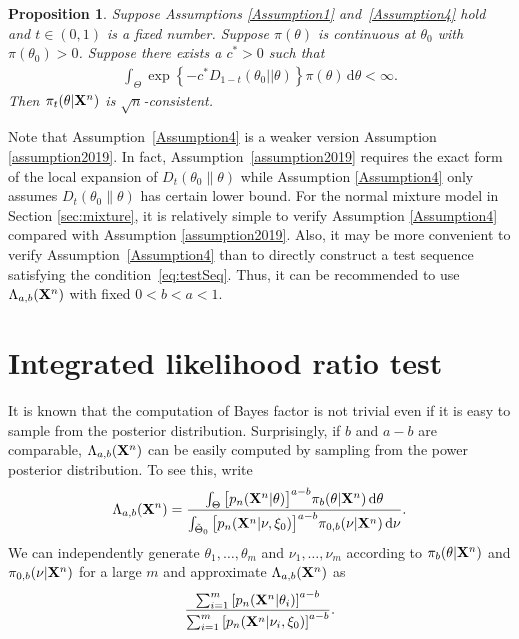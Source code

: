 \documentclass[11pt]{article}
\theoremstyle{plain}
\newtheorem{proposition}{\quad\quad Proposition}
\theoremstyle{definition}
\theoremstyle{remark}
\begin{document}
\begin{proposition}\label{Theoremless1}
    Suppose Assumptions \ref{Assumption1} and~\ref{Assumption4} hold and $t\in(0,1)$ is a fixed number.
    Suppose $\pi(\theta)$ is continuous at $\theta_0$ with $\pi(\theta_0)>0$.
    Suppose there exists a $c^* > 0$ such that
    \begin{align*}
    \int_{\Theta } 
    \exp \left\{  - c^* D_{1-t}(\theta_0||\theta)  \right\} \pi(\theta) \, \mathrm d \theta
< \infty.
    \end{align*}
Then $\pi_t(\theta | \mathbf{X}^{n})$ is $\sqrt n$-consistent.
\end{proposition}
Note that Assumption~\ref{Assumption4} is a weaker version Assumption \ref{assumption2019}.
In fact, Assumption~\ref{assumption2019} requires the exact form of the local expansion of $D_t(\theta_0 \| \theta)$ 
while Assumption \ref{Assumption4} only assumes $D_t(\theta_0 \| \theta)$ has certain lower bound.
For the normal mixture model in Section \ref{sec:mixture}, it is relatively simple to verify Assumption \ref{Assumption4} compared with Assumption \ref{assumption2019}.
Also, it may be more convenient to verify Assumption~\ref{Assumption4} than to directly construct a test sequence satisfying the condition~\eqref{eq:testSeq}.
Thus, it can be recommended to use $\Lambda_{a,b}(\mathbf{X}^n)$ with fixed $0< b< a< 1$.






\section{Integrated likelihood ratio test}

It is known that the computation of Bayes factor is not trivial even if it is easy to sample from the posterior distribution.
Surprisingly, if $b$ and $a-b$ are comparable, $\Lambda_{a,b}(\mathbf{X}^n)$ can be easily computed by sampling from the power posterior distribution.
To see this, write
\begin{equation*}
    \Lambda_{a,b}(\mathbf{X}^n)
    =
    \frac{\int_{\Theta} \big[p_n(\mathbf{X}^{n}|\theta)\big]^{a-b}\pi_b(\theta|\mathbf{X}^{n})\,\mathrm d\theta}{\int_{\tilde{\Theta}_0} \big[p_n(\mathbf{X}^{n}|\nu,\xi_0)\big]^{a-b}\pi_{0,b}(\nu|\mathbf{X}^{n})\, \mathrm d\nu}.
\end{equation*}
We can independently generate $\theta_1,\ldots,\theta_m$ and $\nu_1,\ldots,\nu_m$ according to $\pi_b(\theta|\mathbf{X}^{n})$ and $\pi_{0,b}(\nu | \mathbf{X}^{n})$ for a large $m$ and approximate $\Lambda_{a,b} (\mathbf{X}^n)$ as
\begin{equation*}
    \frac{\sum_{i=1}^m \left[p_n(\mathbf{X}^{n}|\theta_i)\right]^{a-b}}{\sum_{i=1}^m\left[p_n(\mathbf{X}^{n}|\nu_i,\xi_0)\right]^{a-b}}.
\end{equation*}
\end{document}
